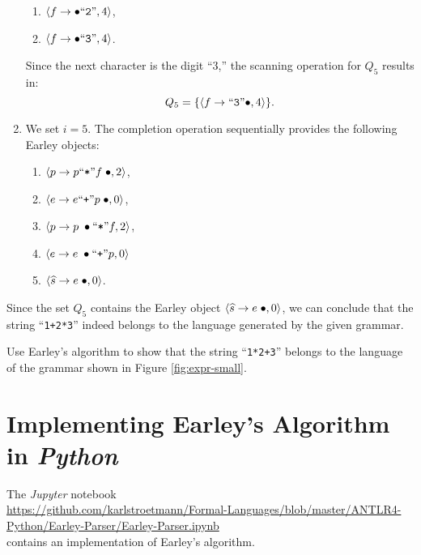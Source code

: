 \begin{enumerate}
\begin{enumerate}
      \item $\pair(f \rightarrow \bullet \squoted{2}, 4)$,
      \item $\pair(f \rightarrow \bullet \squoted{3}, 4)$.
      \end{enumerate}  
      Since the next character is the digit “3,” the scanning operation for $Q_5$ results in:  
      \[
        Q_5 = \{ \pair(f \rightarrow \squoted{3}\bullet, 4) \}.
      \]
\item We set $i = 5$. The completion operation sequentially provides the following Earley objects:
      \begin{enumerate}
      \item $\pair(p \rightarrow p \squoted{*} f\;\bullet, 2)$,
      \item $\pair(e \rightarrow e \squoted{+} p\;\bullet, 0)$,
      \item $\pair(p \rightarrow  p \;\bullet\squoted{*} f, 2)$,
      \item $\pair(e \rightarrow e \;\bullet\squoted{+} p, 0)$ 
      \item $\pair(\widehat{s} \rightarrow  e\;\bullet, 0)$.
      \end{enumerate}
\end{enumerate}
Since the set $Q_5$ contains the Earley object $\pair(\widehat{s} \rightarrow e\;\bullet, 0)$, we can conclude
that the string “\texttt{1+2*3}” indeed belongs to the language generated by the given grammar. 


\exerciseEng
Use Earley's algorithm to show that the string “\texttt{1*2+3}” belongs to the language of the grammar shown in Figure
\ref{fig:expr-small}. \eox


\section{Implementing Earley's Algorithm in \textsl{Python}}
The \textsl{Jupyter} notebook
\\[0.2cm]
\hspace*{-0.3cm}
\href{https://github.com/karlstroetmann/Formal-Languages/blob/master/ANTLR4-Python/Earley-Parser/Earley-Parser.ipynb}{https://github.com/karlstroetmann/Formal-Languages/blob/master/ANTLR4-Python/Earley-Parser/Earley-Parser.ipynb}
\\[0.2cm]
contains an implementation of Earley's algorithm.

